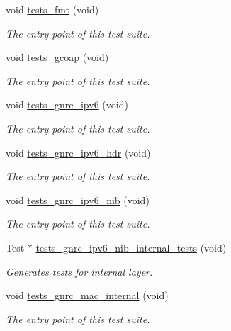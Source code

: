 \begin{DoxyCompactItemize}
void \hyperlink{group__unittests_ga548762e77adf86c79fe9360cee603bbd}{tests\+\_\+fmt} (void)
\begin{DoxyCompactList}\small\item\em The entry point of this test suite. \end{DoxyCompactList}\item 
void \hyperlink{group__unittests_gaa26c3c3743ce9c1e363f071dacf5afa0}{tests\+\_\+gcoap} (void)
\begin{DoxyCompactList}\small\item\em The entry point of this test suite. \end{DoxyCompactList}\item 
void \hyperlink{group__unittests_gaec5ea3d48a03bd5f1f2194f33ce38010}{tests\+\_\+gnrc\+\_\+ipv6} (void)
\begin{DoxyCompactList}\small\item\em The entry point of this test suite. \end{DoxyCompactList}\item 
void \hyperlink{group__unittests_ga5f40f856d40dbcd2b69c5176f7038062}{tests\+\_\+gnrc\+\_\+ipv6\+\_\+hdr} (void)
\begin{DoxyCompactList}\small\item\em The entry point of this test suite. \end{DoxyCompactList}\item 
void \hyperlink{group__unittests_ga94ab40380fa6a4f0472a693ef6b5a9c3}{tests\+\_\+gnrc\+\_\+ipv6\+\_\+nib} (void)
\begin{DoxyCompactList}\small\item\em The entry point of this test suite. \end{DoxyCompactList}\item 
Test $\ast$ \hyperlink{group__unittests_gabe2d41bf28233304c4a66a8ac44c9404}{tests\+\_\+gnrc\+\_\+ipv6\+\_\+nib\+\_\+internal\+\_\+tests} (void)
\begin{DoxyCompactList}\small\item\em Generates tests for internal layer. \end{DoxyCompactList}\item 
void \hyperlink{group__unittests_ga4520245974f5c91b71a68215b4910126}{tests\+\_\+gnrc\+\_\+mac\+\_\+internal} (void)
\begin{DoxyCompactList}\small\item\em The entry point of this test suite. \end{DoxyCompactList}\item 

\end{DoxyCompactItemize}
